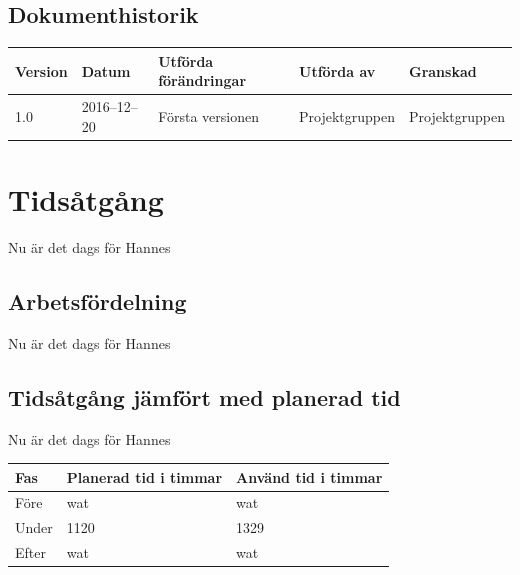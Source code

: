 \documentclass[a4paper,titlepage,12pt]{article}
\begin{document}
\begin{center}
		
		
		\section*{Dokumenthistorik}
		\renewcommand*{\arraystretch}{1.4}
		\begin{longtable}[c]{ l l >{\raggedright}p{5cm} >{\raggedright}p{3cm} l }
			\textbf{Version} & \textbf{Datum} & \textbf{Utförda förändringar} 
			& \textbf{Utförda av} & \textbf{Granskad} \\ \midrule
			
			1.0 & 2016--12--20 & Första versionen & Projektgruppen &
			Projektgruppen \\
			
		\end{longtable}
	\end{center}
	
	
	\newpage
	
	\raggedright
	
	\section{Tidsåtgång}
	Nu är det dags för Hannes
	
	\subsection{Arbetsfördelning}
	Nu är det dags för Hannes
	
	\subsection{Tidsåtgång jämfört med planerad tid}
	Nu är det dags för Hannes
	
	\begin{longtable}[c]{l l l }
		\textbf{Fas} & \textbf{Planerad tid i timmar} & \textbf{Använd tid i timmar} \\ \midrule
		Före & wat & wat \\
		Under & 1120 & 1329 \\
		Efter & wat & wat \\
	\end{longtable}
	
\end{document}
